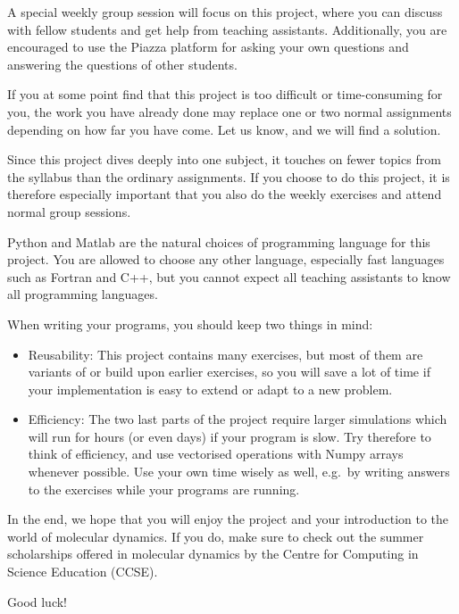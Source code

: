 \documentclass[11pt,british,a4paper]{report}
\begin{document}
A special weekly group session will focus on this project, where you can discuss with fellow students and get help from teaching assistants. Additionally, you are encouraged to use the Piazza platform for asking your own questions and answering the questions of other students.

If you at some point find that this project is too difficult or time-consuming for you, the work you have already done may replace one or two normal assignments depending on how far you have come. Let us know, and we will find a solution.

Since this project dives deeply into one subject, it touches on fewer topics from the syllabus than the ordinary assignments. If you choose to do this project, it is therefore especially important that you also do the weekly exercises and attend normal group sessions.

Python and Matlab are the natural choices of programming language for this project. You are allowed to choose any other language, especially fast languages such as Fortran and C++, but you cannot expect all teaching assistants to know all programming languages.

When writing your programs, you should keep two things in mind:
\begin{itemize}
    \item Reusability: This project contains many exercises, but most of them are variants of or build upon earlier exercises, so you will save a lot of time if your implementation is easy to extend or adapt to a new problem.
    \item Efficiency: The two last parts of the project require larger simulations which will run for hours (or even days) if your program is slow. Try therefore to think of efficiency, and use vectorised operations with Numpy arrays whenever possible. Use your own time wisely as well, e.g.\ by writing answers to the exercises while your programs are running.
\end{itemize}

In the end, we hope that you will enjoy the project and your introduction to the world of molecular dynamics. If you do, make sure to check out the summer scholarships offered in molecular dynamics by the Centre for Computing in Science Education (CCSE).

Good luck!


\clearpage

\end{document}
